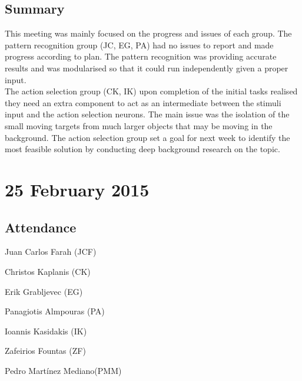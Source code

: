 \documentclass[a4paper,11pt]{article}
\begin{document}
\subsection*{Summary}
This meeting was mainly focused on the progress and issues of each group. The pattern recognition group (JC, EG, PA) had no issues to report and made progress according to plan. The pattern recognition was providing accurate results and was modularised so that it could run independently given a proper input.
\\ The action selection group (CK, IK) upon completion of the initial tasks realised they need an extra component to act as an intermediate between the stimuli input and the action selection neurons. The main issue was the isolation of the small moving targets from much larger objects that may be moving in the background. The action selection group set a goal for next week to identify the most feasible solution by conducting deep background research on the topic.

\maketitle
\section*{25 February 2015}
\subsection*{Attendance}
\begin{compactenum}
\item Juan Carlos Farah (JCF)
\item Christos Kaplanis (CK)
\item Erik Grabljevec (EG)
\item Panagiotis Almpouras (PA)
\item Ioannis Kasidakis (IK)
\item Zafeirios Fountas (ZF)
\item Pedro Martínez Mediano(PMM)
\end{compactenum}
\end{document}

